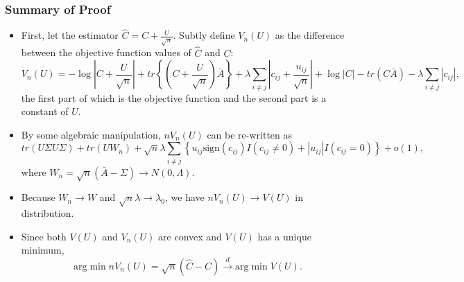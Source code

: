 \subsubsection*{Summary of Proof}
\begin{itemize}
\item First, let the estimator $\hat{C}=C+\frac{U}{\sqrt{n}}$. Subtly define $V_n(U)$ as the difference between the objective function values of $\hat{C}$ and $C$: \[V_n(U)=-\log\left\vert C+\frac{U}{\sqrt{n}}\right\vert +tr\left\lbrace \left( C+\frac{U}{\sqrt{n}}\right) \bar{A}\right\rbrace +\lambda \sum_{i\neq j} \left\vert c_{ij}+\frac{u_{ij}}{\sqrt{n}}\right\vert +\log|C|-tr(C\bar{A})-\lambda \sum_{i\neq j}|c_{ij}|\mbox{,}\]
the first part of which is the objective function and the second part is a constant of $U$. 
\item By some algebraic manipulation, $nV_n(U)$ can be re-written as \[tr(U\Sigma U\Sigma )+tr(UW_n)+\sqrt{n} \lambda \sum_{i\neq j}\left\lbrace u_{ij} \mbox{sign} (c_{ij})I(c_{ij}\neq 0)+|u_{ij}| I(c_{ij} =0)\right\rbrace +o(1)\mbox{,}\]
where $W_n=\sqrt{n}(\bar{A}-\Sigma)\rightarrow N(0,\Lambda)$. 
\item Because $W_n\rightarrow W$ and $\sqrt{n} \lambda \rightarrow \lambda_0$, we have $nV_n(U)\rightarrow V(U)$ in distribution. 
\item Since both $V(U)$ and $V_n(U)$ are convex and $V(U)$ has a unique minimum, \[\mbox{arg} \min nV_n\left( U\right)=\sqrt{n} \left( \hat{C} - C\right) \stackrel{d}{\rightarrow} \mbox{arg} \min V\left( U\right) \mbox{.} \]
\end{itemize}
